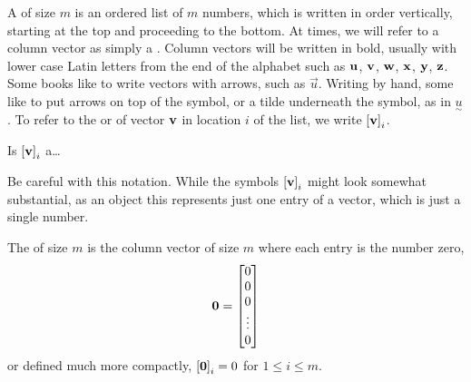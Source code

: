 \documentclass{ximera}
\begin{document}
\begin{definition}
A  of size $m$ is an ordered list of $m$ numbers, which is written in order vertically, starting at the top and proceeding to the bottom.  At times, we will refer to a column vector as simply a .  Column vectors will be written in bold, usually with lower case Latin letters from the end of the alphabet such as $\mathbf{u}$, $\mathbf{v}$, $\mathbf{w}$, $\mathbf{x}$, $\mathbf{y}$, $\mathbf{z}$.  Some books like to write vectors with arrows, such as $\vec{u}$.  Writing by hand, some like to put arrows on top of the symbol, or a tilde underneath the symbol, as in $\underset{\sim}{\textstyle u}$.  To refer to the  or  of vector $\mathbf{v}$ in location $i$ of the list, we write $\left\lbrack\mathbf{v}\right\rbrack_{i}$.
\end{definition}


\begin{question}
  Is $\left\lbrack\mathbf{v}\right\rbrack_{i}$ a\ldots
  \begin{multipleChoice}
  \end{multipleChoice}
  
  \begin{feedback}
    Be careful with this notation.  While the symbols
    $\left\lbrack\mathbf{v}\right\rbrack_{i}$ might look somewhat substantial, as an
    object this represents just one entry of a vector, which is just a
    single number.
  \end{feedback}

\end{question}

\begin{definition}
The  of size $m$ is the column vector of size $m$ where each entry is the number zero,
\[
\mathbf{0}=
\begin{bmatrix}0\\0\\0\\\vdots\\0\end{bmatrix}
\]
or defined much more compactly, $\left\lbrack\mathbf{0}\right\rbrack_{i}=0$ for $1\leq i\leq m$.
\end{definition}
\end{document}
